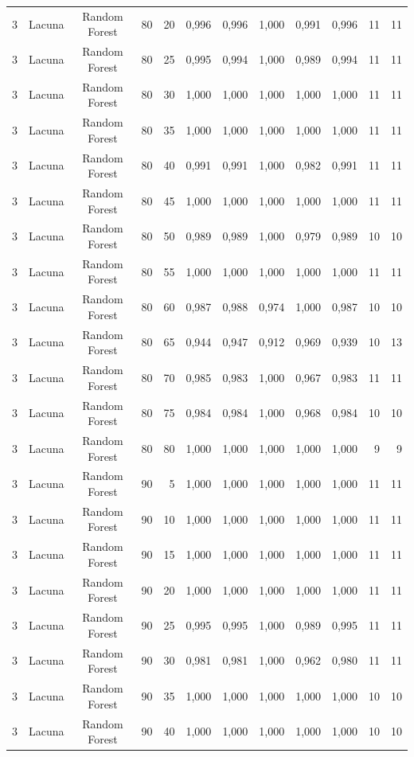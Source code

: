 \begin{longtable}{ccclrrrrrrrr}
3 & Lacuna & Random Forest & 80 & 20 & 0,996 & 0,996 & 1,000 & 0,991 & 0,996 & 11 & 11 \\
3 & Lacuna & Random Forest & 80 & 25 & 0,995 & 0,994 & 1,000 & 0,989 & 0,994 & 11 & 11 \\
3 & Lacuna & Random Forest & 80 & 30 & 1,000 & 1,000 & 1,000 & 1,000 & 1,000 & 11 & 11 \\
3 & Lacuna & Random Forest & 80 & 35 & 1,000 & 1,000 & 1,000 & 1,000 & 1,000 & 11 & 11 \\
3 & Lacuna & Random Forest & 80 & 40 & 0,991 & 0,991 & 1,000 & 0,982 & 0,991 & 11 & 11 \\
3 & Lacuna & Random Forest & 80 & 45 & 1,000 & 1,000 & 1,000 & 1,000 & 1,000 & 11 & 11 \\
3 & Lacuna & Random Forest & 80 & 50 & 0,989 & 0,989 & 1,000 & 0,979 & 0,989 & 10 & 10 \\
3 & Lacuna & Random Forest & 80 & 55 & 1,000 & 1,000 & 1,000 & 1,000 & 1,000 & 11 & 11 \\
3 & Lacuna & Random Forest & 80 & 60 & 0,987 & 0,988 & 0,974 & 1,000 & 0,987 & 10 & 10 \\
3 & Lacuna & Random Forest & 80 & 65 & 0,944 & 0,947 & 0,912 & 0,969 & 0,939 & 10 & 13 \\
3 & Lacuna & Random Forest & 80 & 70 & 0,985 & 0,983 & 1,000 & 0,967 & 0,983 & 11 & 11 \\
3 & Lacuna & Random Forest & 80 & 75 & 0,984 & 0,984 & 1,000 & 0,968 & 0,984 & 10 & 10 \\
3 & Lacuna & Random Forest & 80 & 80 & 1,000 & 1,000 & 1,000 & 1,000 & 1,000 & 9 & 9 \\
3 & Lacuna & Random Forest & 90 & 5 & 1,000 & 1,000 & 1,000 & 1,000 & 1,000 & 11 & 11 \\
3 & Lacuna & Random Forest & 90 & 10 & 1,000 & 1,000 & 1,000 & 1,000 & 1,000 & 11 & 11 \\
3 & Lacuna & Random Forest & 90 & 15 & 1,000 & 1,000 & 1,000 & 1,000 & 1,000 & 11 & 11 \\
3 & Lacuna & Random Forest & 90 & 20 & 1,000 & 1,000 & 1,000 & 1,000 & 1,000 & 11 & 11 \\
3 & Lacuna & Random Forest & 90 & 25 & 0,995 & 0,995 & 1,000 & 0,989 & 0,995 & 11 & 11 \\
3 & Lacuna & Random Forest & 90 & 30 & 0,981 & 0,981 & 1,000 & 0,962 & 0,980 & 11 & 11 \\
3 & Lacuna & Random Forest & 90 & 35 & 1,000 & 1,000 & 1,000 & 1,000 & 1,000 & 10 & 10 \\
3 & Lacuna & Random Forest & 90 & 40 & 1,000 & 1,000 & 1,000 & 1,000 & 1,000 & 10 & 10 \\

\end{longtable}
